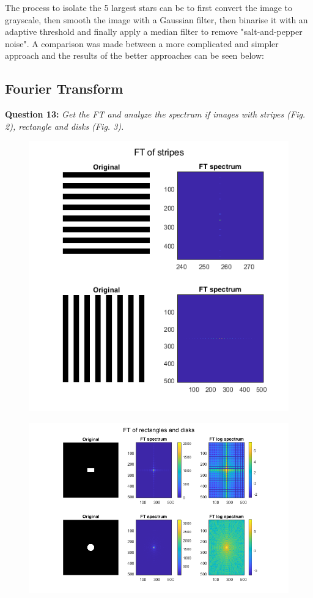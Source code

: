 The process to isolate the 5 largest stars can be to first convert the image to grayscale, then smooth the image with a Gaussian filter, then binarise it with an adaptive threshold and finally apply a median filter to remove "salt-and-pepper noise". A comparison was made between a more complicated and simpler approach and the results of the better approaches can be seen below:





\subsection{Fourier Transform}
\textbf{Question 13:}
\textit{Get the FT and analyze the spectrum if images with stripes (Fig. 2), rectangle and disks (Fig. 3).}


\begin{figure}[H]
    \centering
    \includegraphics[width=0.75\linewidth]{Doc/Graphics/Part1/part1_Question13b.png}
\end{figure}

\begin{figure}[H]
    \centering
    \includegraphics[width=\linewidth]{Doc/Graphics/Part1/Part1_Question13a.png}
\end{figure}

